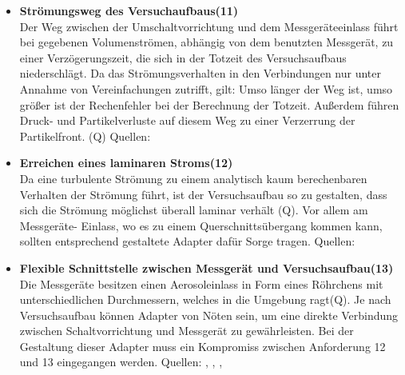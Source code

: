 \begin{itemize}
\item \textbf{Str\"{o}mungsweg des Versuchaufbaus(11)}\\ 
Der Weg zwischen der Umschaltvorrichtung und dem Messger\"{a}teeinlass f\"{u}hrt bei gegebenen Volumenstr\"{o}men, abh\"{a}ngig von dem benutzten Messger\"{a}t, zu einer Verz\"{o}gerungszeit, die sich in der Totzeit des Versuchsaufbaus niederschl\"{a}gt. Da das Str\"{o}mungsverhalten in den Verbindungen nur unter Annahme von Vereinfachungen zutrifft, gilt: Umso l\"{a}nger der Weg ist, umso gr\"{o}{\ss}er ist der Rechenfehler bei der Berechnung der Totzeit. Au{\ss}erdem f\"{u}hren Druck- und Partikelverluste auf diesem Weg zu einer Verzerrung der Partikelfront. (Q)
Quellen: \cite{vdi3491}

\item \textbf{Erreichen eines laminaren Stroms(12)}\\ 
Da eine turbulente Str\"{o}mung zu einem analytisch kaum berechenbaren Verhalten der Str\"{o}mung f\"{u}hrt, ist der Versuchsaufbau so zu gestalten, dass sich die Str\"{o}mung m\"{o}glichst \"{u}berall laminar verh\"{a}lt (Q). Vor allem am Messger\"{a}te- Einlass, wo es zu einem Querschnitts\"{u}bergang kommen kann, sollten entsprechend gestaltete Adapter daf\"{u}r Sorge tragen.
Quellen: \cite{vdi3491}

\item\textbf{Flexible Schnittstelle zwischen Messger\"{a}t und Versuchsaufbau(13)}\\ 
Die Messger\"{a}te besitzen einen Aerosoleinlass in Form eines R\"{o}hrchens mit unterschiedlichen Durchmessern, welches in die Umgebung ragt(Q). Je nach Versuchsaufbau k\"{o}nnen Adapter von N\"{o}ten sein, um eine direkte Verbindung zwischen Schaltvorrichtung und Messger\"{a}t zu gew\"{a}hrleisten. Bei der Gestaltung dieser Adapter muss ein Kompromiss zwischen Anforderung 12 und 13 eingegangen werden.
Quellen: \cite{fmps_3091}, \cite{ops_3330}, \cite{aps_3321}, \cite{ucpc_3776}
\end{itemize}

